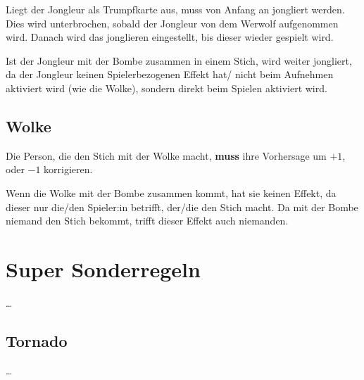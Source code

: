 \documentclass[3pt]{article}
\begin{document}
Liegt der Jongleur als Trumpfkarte aus, muss von Anfang an jongliert werden.
Dies wird unterbrochen, sobald der Jongleur von dem Werwolf aufgenommen wird.
Danach wird das jonglieren eingestellt, bis dieser wieder gespielt wird.

Ist der Jongleur mit der Bombe zusammen in einem Stich, wird weiter jongliert, da der Jongleur keinen Spielerbezogenen Effekt hat/ nicht beim Aufnehmen aktiviert wird (wie die Wolke), sondern direkt beim Spielen aktiviert wird.

\subsection{Wolke}
Die Person, die den Stich mit der Wolke macht, \textbf{muss} ihre Vorhersage um $+1$, oder $-1$ korrigieren.

Wenn die Wolke mit der Bombe zusammen kommt, hat sie keinen Effekt, da dieser nur die/den Spieler:in betrifft, der/die den Stich macht.
Da mit der Bombe niemand den Stich bekommt, trifft dieser Effekt auch niemanden.


\section{Super Sonderregeln}
\ldots

\subsection{Tornado}
\ldots
\end{document}
